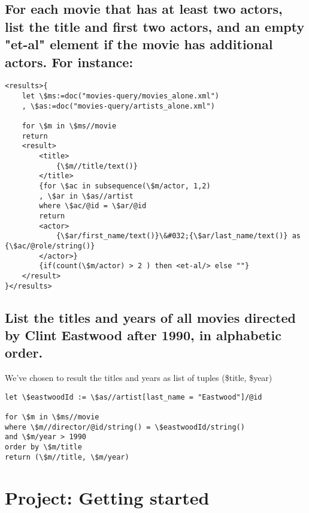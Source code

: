 \subsection{ For each movie that has at least two actors, list the
  title and first two actors, and an empty "et-al" element if the
  movie has additional actors. For instance: }
\begin{lstlisting}
<results>{
    let \$ms:=doc("movies-query/movies_alone.xml")
    , \$as:=doc("movies-query/artists_alone.xml")
    
    for \$m in \$ms//movie
    return
    <result>
        <title>
            {\$m//title/text()}             
        </title>
        {for \$ac in subsequence(\$m/actor, 1,2)
        , \$ar in \$as//artist 
        where \$ac/@id = \$ar/@id 
        return 
        <actor>                                                                                                                          
            {\$ar/first_name/text()}\&#032;{\$ar/last_name/text()} as  {\$ac/@role/string()}
        </actor>}
        {if(count(\$m/actor) > 2 ) then <et-al/> else ""}
    </result>
}</results>
\end{lstlisting}

\subsection{ List the titles and years of all movies directed by Clint
  Eastwood after 1990, in alphabetic order.  }

We've chosen to result the titles and years as list of tuples (\$title, \$year)
\begin{lstlisting}
let \$eastwoodId := \$as//artist[last_name = "Eastwood"]/@id

for \$m in \$ms//movie
where \$m//director/@id/string() = \$eastwoodId/string()
and \$m/year > 1990
order by \$m/title
return (\$m//title, \$m/year)
\end{lstlisting}

\section{Project: Getting started}
